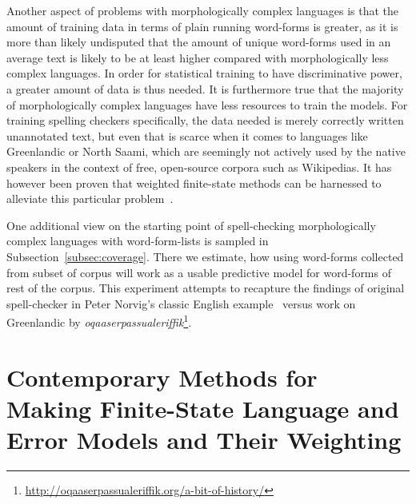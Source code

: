 \documentclass[a4paper,12pt]{article}
\begin{document}
Another aspect of problems with morphologically complex languages is that the
amount of training data in terms of plain running word-forms is greater, as it
is more than likely undisputed that the amount of unique word-forms used in an average text is
likely to be at least higher compared with morphologically less complex languages.
In order for statistical training to have discriminative power, a greater
amount of data is thus needed. It is furthermore true that the majority of
morphologically complex languages have less resources to train the models. For
training spelling checkers specifically, the data needed is merely correctly
written unannotated text, but even that is scarce when it comes to languages
like Greenlandic or North Saami, which are seemingly not actively used by the
native speakers in the context of free, open-source corpora such as Wikipedias.
It has however been proven that weighted finite-state methods can be harnessed
to alleviate this particular problem~\cite[]{pirinen/2010/lrec}.

One additional view on the starting point of spell-checking morphologically
complex languages with word-form-lists is sampled in
Subsection~\ref{subsec:coverage}. There we estimate, how using word-forms
collected from subset of corpus will work as a usable predictive model for
word-forms of rest of the corpus. This experiment attempts to recapture the
findings of original spell-checker in Peter Norvig's classic English
example~\cite[]{norvig/2010} versus work on Greenlandic by
\emph{oqaaserpassualeriffik}\footnote{\url{http://oqaaserpassualeriffik.org/a-bit-of-history/}}.

\section{Contemporary Methods for Making Finite-State Language and Error Models
and Their Weighting}
\label{sec:methods}
\end{document}
